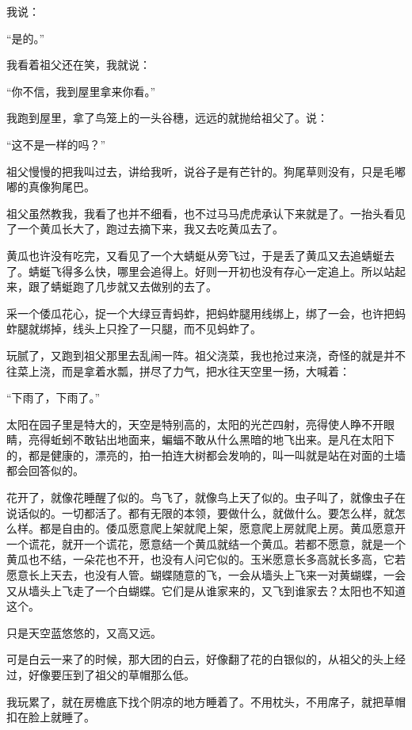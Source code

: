 \par 我说：
\par “是的。”
\par 我看着祖父还在笑，我就说：
\par “你不信，我到屋里拿来你看。”
\par 我跑到屋里，拿了鸟笼上的一头谷穗，远远的就抛给祖父了。说：
\par “这不是一样的吗？”
\par 祖父慢慢的把我叫过去，讲给我听，说谷子是有芒针的。狗尾草则没有，只是毛嘟嘟的真像狗尾巴。
\par 祖父虽然教我，我看了也并不细看，也不过马马虎虎承认下来就是了。一抬头看见了一个黄瓜长大了，跑过去摘下来，我又去吃黄瓜去了。
\par 黄瓜也许没有吃完，又看见了一个大蜻蜓从旁飞过，于是丢了黄瓜又去追蜻蜓去了。蜻蜓飞得多么快，哪里会追得上。好则一开初也没有存心一定追上。所以站起来，跟了蜻蜓跑了几步就又去做别的去了。
\par 采一个倭瓜花心，捉一个大绿豆青蚂蚱，把蚂蚱腿用线绑上，绑了一会，也许把蚂蚱腿就绑掉，线头上只拴了一只腿，而不见蚂蚱了。
\par 玩腻了，又跑到祖父那里去乱闹一阵。祖父浇菜，我也抢过来浇，奇怪的就是并不往菜上浇，而是拿着水瓢，拼尽了力气，把水往天空里一扬，大喊着：
\par “下雨了，下雨了。”
\par 太阳在园子里是特大的，天空是特别高的，太阳的光芒四射，亮得使人睁不开眼睛，亮得蚯蚓不敢钻出地面来，蝙蝠不敢从什么黑暗的地飞出来。是凡在太阳下的，都是健康的，漂亮的，拍一拍连大树都会发响的，叫一叫就是站在对面的土墙都会回答似的。
\par 花开了，就像花睡醒了似的。鸟飞了，就像鸟上天了似的。虫子叫了，就像虫子在说话似的。一切都活了。都有无限的本领，要做什么，就做什么。要怎么样，就怎么样。都是自由的。倭瓜愿意爬上架就爬上架，愿意爬上房就爬上房。黄瓜愿意开一个谎花，就开一个谎花，愿意结一个黄瓜就结一个黄瓜。若都不愿意，就是一个黄瓜也不结，一朵花也不开，也没有人问它似的。玉米愿意长多高就长多高，它若愿意长上天去，也没有人管。蝴蝶随意的飞，一会从墙头上飞来一对黄蝴蝶，一会又从墙头上飞走了一个白蝴蝶。它们是从谁家来的，又飞到谁家去？太阳也不知道这个。
\par 只是天空蓝悠悠的，又高又远。
\par 可是白云一来了的时候，那大团的白云，好像翻了花的白银似的，从祖父的头上经过，好像要压到了祖父的草帽那么低。
\par 我玩累了，就在房檐底下找个阴凉的地方睡着了。不用枕头，不用席子，就把草帽扣在脸上就睡了。
